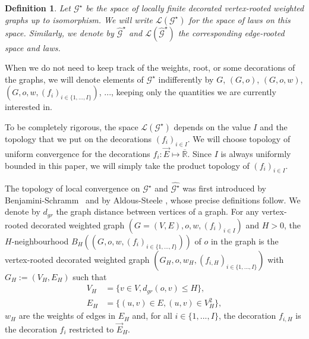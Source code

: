 \documentclass[11pt]{article}
\newtheorem{definition}[prop]{Definition}
\begin{document}
\begin{definition}
Let $\mathcal{G}^{\star}$ be the space of locally finite decorated vertex-rooted weighted graphs up to isomorphism.
We will write $\mathcal{L}(\mathcal{G}^{\star})$ for the space of laws on this space. Similarly, we denote by  $\hat{\mathcal{G}}^{\star}$ and $\mathcal{L}(\hat{\mathcal{G}}^{\star})$ the corresponding edge-rooted space and laws.
\end{definition}
When we do not need to keep track of the weights, root, or some decorations of the graphs, we will denote elements of 
$\mathcal{G}^{\star}$ indifferently by $G$, $(G,o)$, $(G,o,w)$, $(G,o,w,(f_i)_{i \in \{1,...,I\}})$, ..., keeping only the quantities we are currently interested in.
\bigskip
\begin{remark}
    To be completely rigorous, the space $\mathcal{L}(\mathcal{G}^{\star})$ depends on the value $I$ and the topology that we put on the decorations $(f_i)_{i \in I}$. We will choose topology of uniform convergence for the decorations $f_i: \overset{\rightarrow}{E} \mapsto \overline{\mathbb{R}}$. Since $I$ is always uniformly bounded in this paper, we will simply take the product topology of $(f_i)_{i \in I}$.
\end{remark}
The topology of local convergence on $\mathcal{G}^{\star}$ and $\hat{\mathcal{G}^{\star}}$ was first introduced by Benjamini-Schramm~\cite{BenjaminiSchramm1} and by Aldous-Steele \cite{Aldous2004}, whose  precise definitions follow. We denote by $d_{gr}$ the graph distance between vertices of a graph. For any vertex-rooted decorated weighted graph $(G=(V,E),o,w,(f_i)_{i \in I})$ and $H>0$, the $H$-neighbourhood $B_H((G,o,w,(f_i)_{i \in \{1,...,I\}}))$ of $o$ in the graph is the vertex-rooted decorated weighted graph $(G_H,o,w_H,(f_{i,H})_{i \in \{1,...,I\}})$ with $G_H :=(V_H,E_H)$ such that
\begin{align*}
V_H &=\{v \in V, d_{gr}(o,v)\leq H\},\\
E_H &=\{ (u,v) \in E, (u,v)\in V_H^2 \},
\end{align*}
$w_H$ are the weights of edges in $E_H$ and, for all $i \in \{1,...,I\}$, the decoration $f_{i,H}$ is the decoration $f_{i}$ restricted to $\overset{\rightarrow}{E}_H$.
\end{document}

